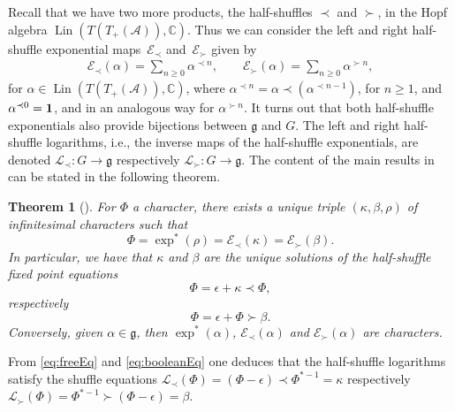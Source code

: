 \documentclass[11pt]{article}
\numberwithin{equation}{section}
\numberwithin{equation}{section}
\newtheorem{Theorem}{Theorem}[section]
\newcommand{\g}{\mathfrak{g}}
\newcommand{\A}{\mathcal{A}}
\newcommand{\uno}{{\bf{1}}}
\newcommand{\Expl}{\mathcal{E}_\prec}
\newcommand{\Expr}{\mathcal{E}_\succ}
\begin{document}
Recall that we have two more products, the half-shuffles $\prec$ and $\succ$, in the Hopf algebra $\operatorname{Lin}(T(T_+(\A)),\mathbb{C})$. Thus we can consider the left and right half-shuffle exponential maps~$\Expl$ and~$\Expr$ given by
\begin{gather*}
	\Expl(\alpha)
	= \sum_{n\geq0} \alpha^{\prec n},\qquad
	\Expr(\alpha)
	= \sum_{n\geq0} \alpha^{\succ n},
\end{gather*}
for $\alpha\in \operatorname{Lin}(T(T_+(\A)),\mathbb{C})$, where $\alpha^{\prec n} = \alpha \prec (\alpha^{\prec n-1})$, for $n\geq1$, and $\alpha^{\prec 0} = \uno$, and in an analogous way for $\alpha^{\succ n}$. It turns out that both half-shuffle exponentials also provide bijections between $\g$ and $G$. The left and right half-shuffle logarithms, i.e., the inverse maps of the half-shuffle exponentials, are denoted $\mathcal{L}_\prec\colon G \to \g$ respectively $\mathcal{L}_\succ\colon G \to \g$. The content of the main results in \cite{EFP1,EFP3} can be stated in the following theorem.

\begin{Theorem}[\cite{EFP1,EFP3}]\label{thm:basicEFP}
For $\Phi$ a character, there exists a unique triple $(\kappa,\beta,\rho)$ of infinitesimal characters such that
\begin{equation}\label{eq:shuffleMCRel}
	\Phi = \exp^*(\rho) = \Expl(\kappa) = \Expr(\beta).
\end{equation}
In particular, we have that $\kappa$ and $\beta$ are the unique solutions of the half-shuffle fixed point equations
\begin{equation}\label{eq:freeEq}
	\Phi = \epsilon + \kappa\prec \Phi,
\end{equation}
respectively
\begin{equation}\label{eq:booleanEq}
	\Phi = \epsilon +\Phi\succ \beta.
\end{equation}
Conversely, given $\alpha\in \g$, then $\exp^*(\alpha)$, $\Expl(\alpha)$ and $\Expr(\alpha)$ are characters.
\end{Theorem}

From \eqref{eq:freeEq} and \eqref{eq:booleanEq} one deduces that the half-shuffle logarithms satisfy the shuffle equations $\mathcal{L}_\prec(\Phi)=(\Phi-\epsilon) \prec\Phi^{*-1}=\kappa$ respectively $\mathcal{L}_\succ(\Phi)=\Phi^{*-1} \succ (\Phi-\epsilon)=\beta$.
\end{document}
